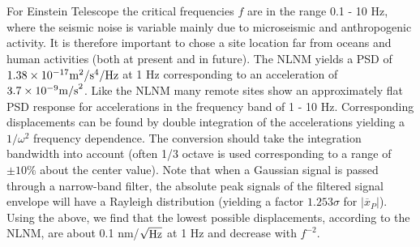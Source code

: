For Einstein Telescope the critical frequencies $f$ are in the range 0.1 - 10 Hz, where the seismic noise is variable mainly due to microseismic and anthropogenic activity. It is therefore important to chose a site location far from oceans and human activities (both at present and in future). The NLNM yields a PSD of $1.38 \times 10^{-17}{\rm m}^2/{\rm s}^4/{\rm Hz}$ at 1 Hz corresponding to an acceleration of $3.7 \times 10^{-9}{\rm m/s}^{2}$. Like the NLNM many remote sites show an approximately flat PSD response for accelerations in the frequency band of 1 - 10 Hz. Corresponding displacements can be found by double integration of the accelerations yielding a $1/\omega^2$ frequency dependence. The conversion should take the integration bandwidth into account (often 1/3 octave is used corresponding to a range of $\pm 10 \%$ about the center value). Note that when a Gaussian signal is passed through a narrow-band filter, the absolute peak signals of the filtered signal envelope will have a Rayleigh distribution (yielding a factor $1.253 \sigma$ for $\vert \overline{x}_P \vert$). Using the above, we find that the lowest possible displacements, according to the NLNM, are about 0.1 nm/$\sqrt{\rm Hz}$ at 1 Hz and decrease with $f^{-2}$.
